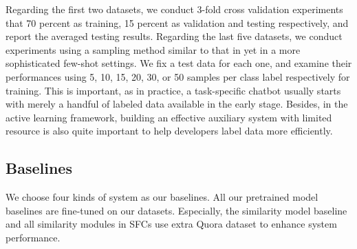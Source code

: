 Regarding  the first two datasets, we conduct 3-fold cross validation experiments
that   70   percent   as  training,  15  percent  as  validation  and  testing
respectively,  and  report  the  averaged  testing results. Regarding the last
five datasets, we conduct experiments using a sampling method similar to that
in   \cite{casanueva2020efficient}   yet  in  a  more  sophisticated  few-shot
settings.  We  fix  a  test  data for each one, and examine their performances
using  5,  10,  15,  20,  30,  or 50 samples per class label respectively for
training.  This  is important, as in practice, a task-specific chatbot usually
starts  with  merely  a  handful of labeled data available in the early stage.
Besides,  in  the  active  learning framework, building an effective auxiliary
system  with limited resource is also quite important to help developers label
data more efficiently.

\subsection{Baselines}
We  choose  four kinds of system as our baselines. All our pretrained
model   baselines  are  fine-tuned  on  our datasets.
Especially, the similarity  model  baseline  and all similarity modules in SFCs
use extra Quora  dataset  \cite{iyer2017first}  to enhance system performance.

